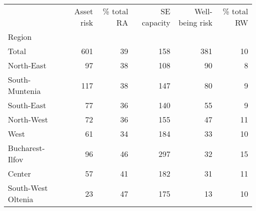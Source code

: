 \begin{tabular}{lrrrrr}
\toprule
{} &  Asset risk &  \% total RA &  SE capacity &  Well-being risk &  \% total RW \\
Region             &             &             &              &                  &             \\
\midrule
Total              &         601 &          39 &          158 &              381 &          10 \\
North-East         &          97 &          38 &          108 &               90 &           8 \\
South-Muntenia     &         117 &          38 &          147 &               80 &           9 \\
South-East         &          77 &          36 &          140 &               55 &           9 \\
North-West         &          72 &          36 &          155 &               47 &          11 \\
West               &          61 &          34 &          184 &               33 &          10 \\
Bucharest-Ilfov    &          96 &          46 &          297 &               32 &          15 \\
Center             &          57 &          41 &          182 &               31 &          11 \\
South-West Oltenia &          23 &          47 &          175 &               13 &          10 \\
\bottomrule
\end{tabular}
